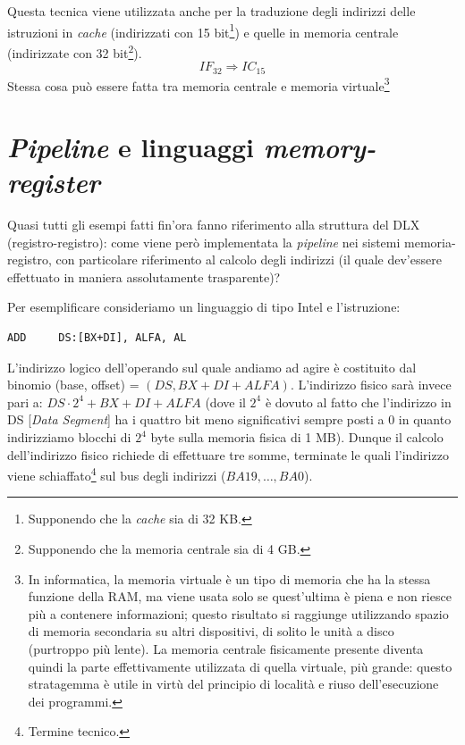 Questa tecnica viene utilizzata anche per la traduzione degli indirizzi delle istruzioni in \textit{cache} (indirizzati con 15 bit\footnote{Supponendo che la \textit{cache} sia di 32 KB.}) e quelle in memoria centrale (indirizzate con 32 bit\footnote{Supponendo che la memoria centrale sia di 4 GB.}). 
\[
IF_{32} \Rightarrow IC_{15}
\]
Stessa cosa può essere fatta tra memoria centrale e memoria virtuale\footnote{In informatica, la memoria virtuale è un tipo di memoria che ha la stessa funzione della RAM, ma viene usata solo se quest'ultima è piena e non riesce più a contenere informazioni; questo risultato si raggiunge utilizzando spazio di memoria secondaria su altri dispositivi, di solito le unità a disco (purtroppo più lente). La memoria centrale fisicamente presente diventa quindi la parte effettivamente utilizzata di quella virtuale, più grande: questo stratagemma è utile in virtù del principio di località e riuso dell'esecuzione dei programmi.}

\section{\textit{Pipeline} e linguaggi \textit{memory-register}}
\label{sec:pipelineMemoryRegister}

Quasi tutti gli esempi fatti fin'ora fanno riferimento alla struttura del DLX (registro-registro): come viene però implementata la \textit{pipeline} nei sistemi memoria-registro, con particolare riferimento al calcolo degli indirizzi (il quale dev'essere effettuato in maniera assolutamente trasparente)?

Per esemplificare consideriamo un linguaggio di tipo Intel e l'istruzione:
\begin{verbatim}
ADD     DS:[BX+DI], ALFA, AL
\end{verbatim}
L'indirizzo logico dell'operando sul quale andiamo ad agire è costituito dal binomio (base, offset) = $(DS, BX + DI + ALFA)$.
L'indirizzo fisico sarà invece pari a: $DS \cdot 2^4 + BX + DI + ALFA$ (dove il $2^4$ è dovuto al fatto che l'indirizzo in DS [\textit{Data Segment}] ha i quattro bit meno significativi sempre posti a 0 in quanto indirizziamo blocchi di $2^4$ byte sulla memoria fisica di 1 MB).
Dunque il calcolo dell'indirizzo fisico richiede di effettuare tre somme, terminate le quali l'indirizzo viene schiaffato\footnote{Termine tecnico.} sul bus degli indirizzi ($BA19,\ldots,BA0$).


